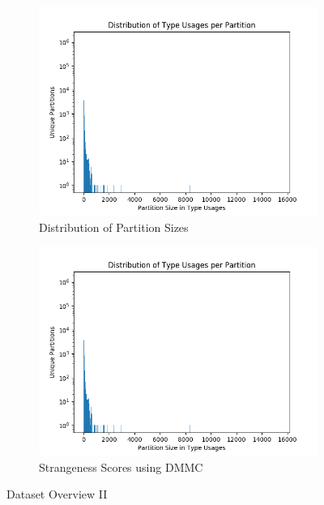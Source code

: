 \begin{figure}[t]
    \centering
    \begin{subfigure}[h]{0.49\textwidth}
        \centering
        \includegraphics[width=1.1\textwidth]{figures/graph_tus_partition}
        \caption{Distribution of Partition Sizes}
        \label{fig:tus_partition}
    \end{subfigure}
    \begin{subfigure}[h]{0.49\textwidth}
        \centering
        \includegraphics[width=1.1\textwidth]{figures/graph_strangeness}
        \caption{Strangeness Scores using $\text{DMMC}$}
        \label{fig:strangeness}
    \end{subfigure}
    \caption{Dataset Overview II}
\end{figure}


